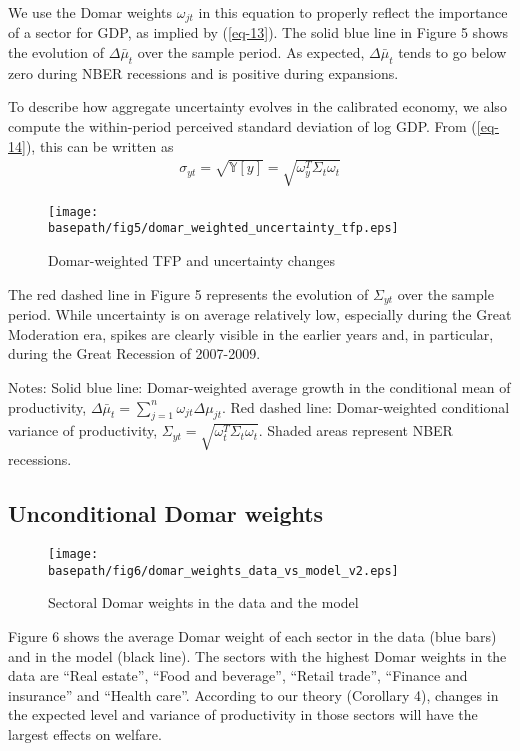 \documentclass[11pt]{article}
\theoremstyle{definition}
\newcommand{\basepath}{F:/12004835/replication_package_final/replication_package_final/output_figures}
\begin{document}
	We use the Domar weights $\omega_{jt}$ in this equation to properly reflect the importance of a sector for GDP, as implied by (\ref{eq-13}). The solid blue line in Figure 5 shows the evolution of $\Delta\bar{\mu}_t$ over the sample period. As expected, $\Delta\bar{\mu}_t$ tends to go below zero during NBER recessions and is positive during expansions.
	
	To describe how aggregate uncertainty evolves in the calibrated economy, we also compute the within-period perceived standard deviation of log GDP. From (\ref{eq-14}), this can be written as
	\begin{align}
		\sigma_{yt} = \sqrt{\mathbb{Y}[y]} = \sqrt{\omega_y^T \Sigma_t \omega_t} \label{eq-71}
	\end{align}
	
	\begin{figure}[ht]
		\caption{Domar-weighted TFP and uncertainty changes}
		\texttt{[image: \\basepath/fig5/domar\_weighted\_uncertainty\_tfp.eps]}
		\label{fig:5}
	\end{figure}
	
	The red dashed line in Figure 5 represents the evolution of $\Sigma_{yt}$ over the sample period. While uncertainty is on average relatively low, especially during the Great Moderation era, spikes are clearly visible in the earlier years and, in particular, during the Great Recession of 2007-2009.
	
	Notes: Solid blue line: Domar-weighted average growth in the conditional mean of productivity, $\Delta\bar{\mu}_t = \sum\limits_{j=1}^n \omega_{jt}\Delta\mu_{jt}$. Red dashed line: Domar-weighted conditional variance of productivity, $\Sigma_{yt} = \sqrt{\omega_t^T \Sigma_t \omega_t}$. Shaded areas represent NBER recessions.
	
	\subsection*{Unconditional Domar weights}
	
	\begin{figure}[ht]
		\centering
		\caption{Sectoral Domar weights in the data and the model}
		\texttt{[image: \\basepath/fig6/domar\_weights\_data\_vs\_model\_v2.eps]}
		\label{fig:6}
	\end{figure}
	
	Figure 6 shows the average Domar weight of each sector in the data (blue bars) and in the model (black line). The sectors with the highest Domar weights in the data are ``Real estate'', ``Food and beverage'', ``Retail trade'', ``Finance and insurance'' and ``Health care''. According to our theory (Corollary 4), changes in the expected level and variance of productivity in those sectors will have the largest effects on welfare.
	
\end{document}
